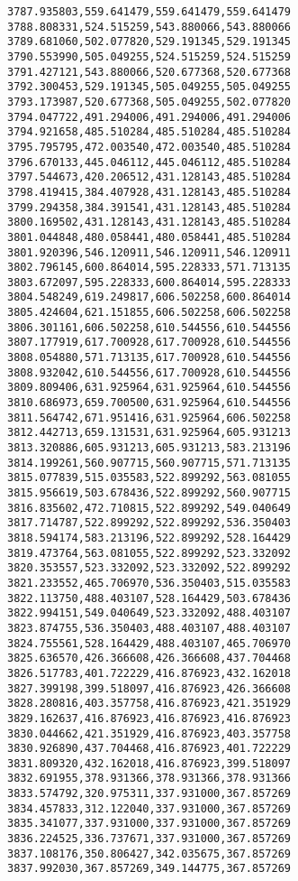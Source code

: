 \documentclass[11pt]{article}
\begin{document}
\begin{Verbatim}[commandchars=\\\{\}]
3787.935803,559.641479,559.641479,559.641479
3788.808331,524.515259,543.880066,543.880066
3789.681060,502.077820,529.191345,529.191345
3790.553990,505.049255,524.515259,524.515259
3791.427121,543.880066,520.677368,520.677368
3792.300453,529.191345,505.049255,505.049255
3793.173987,520.677368,505.049255,502.077820
3794.047722,491.294006,491.294006,491.294006
3794.921658,485.510284,485.510284,485.510284
3795.795795,472.003540,472.003540,485.510284
3796.670133,445.046112,445.046112,485.510284
3797.544673,420.206512,431.128143,485.510284
3798.419415,384.407928,431.128143,485.510284
3799.294358,384.391541,431.128143,485.510284
3800.169502,431.128143,431.128143,485.510284
3801.044848,480.058441,480.058441,485.510284
3801.920396,546.120911,546.120911,546.120911
3802.796145,600.864014,595.228333,571.713135
3803.672097,595.228333,600.864014,595.228333
3804.548249,619.249817,606.502258,600.864014
3805.424604,621.151855,606.502258,606.502258
3806.301161,606.502258,610.544556,610.544556
3807.177919,617.700928,617.700928,610.544556
3808.054880,571.713135,617.700928,610.544556
3808.932042,610.544556,617.700928,610.544556
3809.809406,631.925964,631.925964,610.544556
3810.686973,659.700500,631.925964,610.544556
3811.564742,671.951416,631.925964,606.502258
3812.442713,659.131531,631.925964,605.931213
3813.320886,605.931213,605.931213,583.213196
3814.199261,560.907715,560.907715,571.713135
3815.077839,515.035583,522.899292,563.081055
3815.956619,503.678436,522.899292,560.907715
3816.835602,472.710815,522.899292,549.040649
3817.714787,522.899292,522.899292,536.350403
3818.594174,583.213196,522.899292,528.164429
3819.473764,563.081055,522.899292,523.332092
3820.353557,523.332092,523.332092,522.899292
3821.233552,465.706970,536.350403,515.035583
3822.113750,488.403107,528.164429,503.678436
3822.994151,549.040649,523.332092,488.403107
3823.874755,536.350403,488.403107,488.403107
3824.755561,528.164429,488.403107,465.706970
3825.636570,426.366608,426.366608,437.704468
3826.517783,401.722229,416.876923,432.162018
3827.399198,399.518097,416.876923,426.366608
3828.280816,403.357758,416.876923,421.351929
3829.162637,416.876923,416.876923,416.876923
3830.044662,421.351929,416.876923,403.357758
3830.926890,437.704468,416.876923,401.722229
3831.809320,432.162018,416.876923,399.518097
3832.691955,378.931366,378.931366,378.931366
3833.574792,320.975311,337.931000,367.857269
3834.457833,312.122040,337.931000,367.857269
3835.341077,337.931000,337.931000,367.857269
3836.224525,336.737671,337.931000,367.857269
3837.108176,350.806427,342.035675,367.857269
3837.992030,367.857269,349.144775,367.857269

\end{Verbatim}
\end{document}
